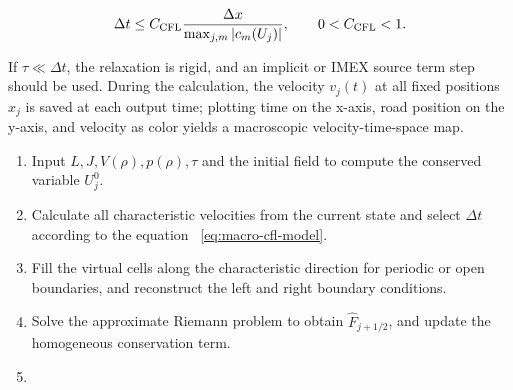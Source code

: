 \documentclass[11pt,a4paper,openany]{book}
\numberwithin{equation}{chapter}
\numberwithin{figure}{chapter}
\numberwithin{table}{chapter}
\begin{document}
\begin{equation}
\Delta t\le C_{\rm CFL}
\frac{\Delta x}{\max_{j,m}|c_m(U_j)|},
\qquad 0<C_{\rm CFL}<1.
\label{eq:macro-cfl-model}
\end{equation}

If $\tau\ll\Delta t$, the relaxation is rigid, and an implicit or IMEX source term step should be used. During the calculation, the velocity $v_j(t)$ at all fixed positions $x_j$ is saved at each output time; plotting time on the x-axis, road position on the y-axis, and velocity as color yields a macroscopic velocity-time-space map.










\begin{tcolorbox}[experimentbox,title=\textbf{Pseudocode for the Macro-scale Finite Volume Algorithm}]
\small
\begin{enumerate}[leftmargin=1.7em,itemsep=2pt]
\item




Input $L,J,V(\rho),p(\rho),\tau$ and the initial field to compute the conserved variable $U_j^0$.







\item




 Calculate all characteristic velocities from the current state and select $\Delta t$ according to the equation ~\eqref{eq:macro-cfl-model}.







\item




Fill the virtual cells along the characteristic direction for periodic or open boundaries, and reconstruct the left and right boundary conditions.


\item Solve the approximate Riemann problem to obtain $\widehat F_{j+1/2}$, and update the homogeneous conservation term.







\item





\end{enumerate}
\end{tcolorbox}
\end{document}
